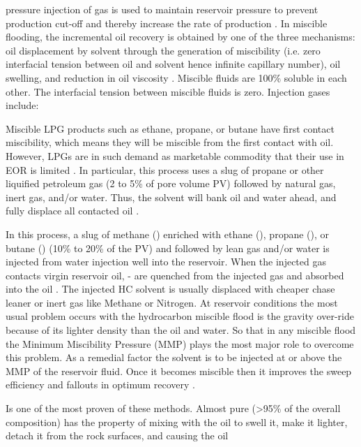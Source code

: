 \begin{description}[style=nextline]
pressure injection of gas is used to maintain reservoir pressure to prevent 
production cut-off and thereby increase the rate of production \citep{Anazi}. 
In miscible flooding, the incremental oil recovery is obtained by one 
of the three mechanisms: oil displacement by solvent through the generation of 
miscibility (i.e. zero interfacial tension between oil and solvent hence 
infinite capillary number), oil swelling, and reduction in oil viscosity 
\citep{Kulkarni}. Miscible fluids are 100\% soluble in each other. The 
interfacial tension between miscible fluids is zero. Injection gases include:
\item[\textbf{LPG injection}]
Miscible LPG products such as ethane, propane, or butane have 
first contact miscibility, which means they will be miscible from the first 
contact with oil. However, LPGs are in such demand as marketable commodity that 
their use in EOR is limited \citep{Romero}. In particular, this process 
uses a slug of propane or other liquified petroleum gas (2 to 5\% of pore volume 
PV) followed by natural gas, inert gas, and/or water. Thus, the solvent will 
bank oil and water ahead, and fully displace all contacted oil \citep{Anazi}.
\item[\textbf{Enriched gas miscible process}]
In this process, a slug of methane () enriched 
with ethane (), propane (), or butane () (10\% to 20\% of the PV) and 
followed by lean gas and/or water is injected from water injection well into the 
reservoir. When the injected gas contacts virgin reservoir oil, - are 
quenched from the injected gas and absorbed into the oil \citep{Anazi}. 
The injected HC solvent is usually displaced with cheaper chase leaner or inert 
gas like Methane or Nitrogen. At reservoir conditions the most usual problem 
occurs with the hydrocarbon miscible flood is the gravity over-ride because of 
its lighter density than the oil and water. So that in any miscible flood the 
Minimum Miscibility Pressure (MMP) plays the most major role to overcome this 
problem. As a remedial factor the solvent is to be injected at or above the MMP 
of the reservoir fluid. Once it becomes miscible then it improves the sweep 
efficiency and fallouts in optimum recovery \citep{Syed}.
\item[\textbf{Carbon dioxide (\ce{CO2} ) injection}]
Is one of the most proven of these methods. Almost pure  
(>95\% of the overall composition) has the property of mixing with the oil to 
swell it, make it lighter, detach it from the rock surfaces, and causing the oil 

\end{description}
